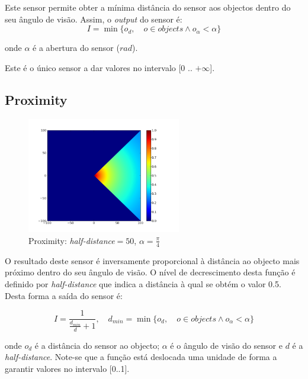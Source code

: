 \documentclass[a4paper]{article}
\begin{document}
\indent Este sensor permite obter a mínima distância do sensor aos objectos dentro do seu ângulo de visão.
Assim, o \emph{output} do sensor é:
\[
	I = \min\{o_{d},\quad o \in objects \land o_{\alpha} < \alpha\}
\] 

onde $\alpha$ é a abertura do sensor ($rad$).

Este é o único sensor a dar valores no intervalo [0 .. $+\infty$].

\cleardoublepage
\subsection{Proximity}
\begin{figure}[h]
	\vspace{-20pt}
	\begin{center}
		\includegraphics[width=0.6\textwidth]{graphs/sensors/proximity.png}
	\end{center}
	\vspace{-20pt}
	\caption{Proximity: \emph{half-distance}$=50$, $\alpha=\frac{\pi}{4}$}
\end{figure}

\indent O resultado deste sensor é inversamente proporcional à distância ao objecto mais próximo dentro do seu ângulo de visão.
O nível de decrescimento desta função é definido por \emph{half-distance} que indica a distância à qual se obtém o valor 0.5.
Desta forma a saída do sensor é:

\[
	I = \frac{1}{\frac{d_{min}}{d}+1},\quad d_{min} = \min\{o_{d},\quad o \in objects \land o_{\alpha} < \alpha\}
\]

onde $o_{d}$ é a distância do sensor ao objecto; $\alpha$ é o ângulo de visão do sensor e $d$ é a \emph{half-distance}.
Note-se que a função está deslocada uma unidade de forma a garantir valores no intervalo [0..1].

\cleardoublepage
\end{document}

